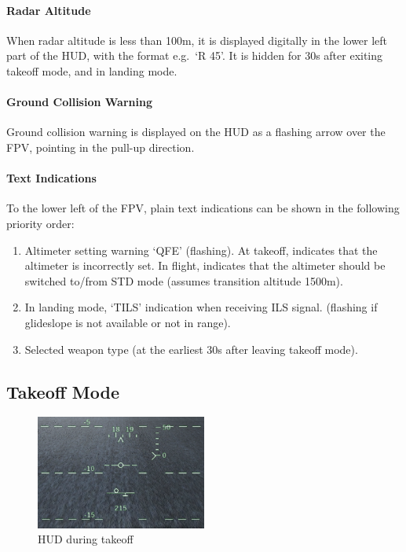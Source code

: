 \paragraph{Radar Altitude}
When radar altitude is less than 100m, it is displayed digitally
in the lower left part of the HUD, with the format e.g.\ `R 45'.
It is hidden for 30s after exiting takeoff mode, and in landing mode.

\paragraph{Ground Collision Warning}
Ground collision warning is displayed on the HUD as
a flashing arrow over the FPV, pointing in the pull-up direction.

\paragraph{Text Indications}
To the lower left of the FPV, plain text indications
can be shown in the following priority order:
\begin{enumerate}
  \item Altimeter setting warning `QFE' (flashing).
    At takeoff, indicates that the altimeter is incorrectly set.
    In flight, indicates that the altimeter should be switched to/from STD mode
    (assumes transition altitude 1500m).
  \item In landing mode, `TILS' indication when receiving ILS signal.
    (flashing if glideslope is not available or not in range).
  \item Selected weapon type (at the earliest 30s after leaving takeoff mode).
\end{enumerate}


\subsection{Takeoff Mode}
\begin{figure}[!ht]
  \centering
  \includegraphics[width=0.5\textwidth]{images/displays/ja-hud-takeoff.png}
  \caption{HUD during takeoff}
  \label{fig:hud-takeoff}
\end{figure}

